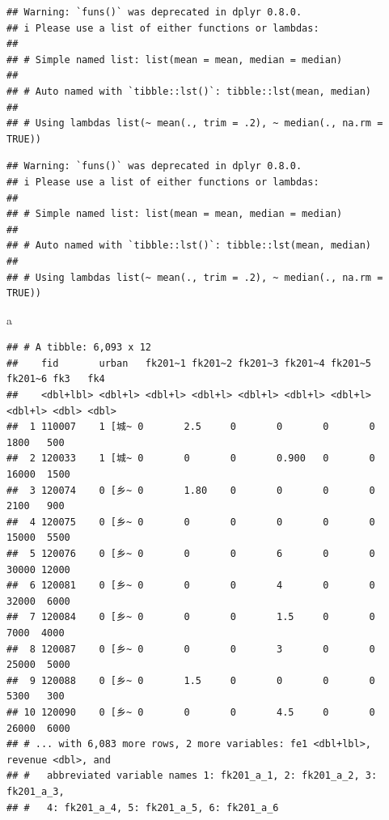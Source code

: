 \documentclass[
]{book}
\newenvironment{Shaded}{\begin{snugshade}}{\end{snugshade}}
\newcommand{\NormalTok}[1]{#1}
\begin{document}
\begin{verbatim}
## Warning: `funs()` was deprecated in dplyr 0.8.0.
## i Please use a list of either functions or lambdas:
## 
## # Simple named list: list(mean = mean, median = median)
## 
## # Auto named with `tibble::lst()`: tibble::lst(mean, median)
## 
## # Using lambdas list(~ mean(., trim = .2), ~ median(., na.rm = TRUE))
\end{verbatim}

\begin{verbatim}
## Warning: `funs()` was deprecated in dplyr 0.8.0.
## i Please use a list of either functions or lambdas:
## 
## # Simple named list: list(mean = mean, median = median)
## 
## # Auto named with `tibble::lst()`: tibble::lst(mean, median)
## 
## # Using lambdas list(~ mean(., trim = .2), ~ median(., na.rm = TRUE))
\end{verbatim}

\begin{Shaded}
\begin{Highlighting}[]
\NormalTok{a}
\end{Highlighting}
\end{Shaded}

\begin{verbatim}
## # A tibble: 6,093 x 12
##    fid       urban   fk201~1 fk201~2 fk201~3 fk201~4 fk201~5 fk201~6 fk3   fk4  
##    <dbl+lbl> <dbl+l> <dbl+l> <dbl+l> <dbl+l> <dbl+l> <dbl+l> <dbl+l> <dbl> <dbl>
##  1 110007    1 [城~ 0       2.5     0       0       0       0        1800   500
##  2 120033    1 [城~ 0       0       0       0.900   0       0       16000  1500
##  3 120074    0 [乡~ 0       1.80    0       0       0       0        2100   900
##  4 120075    0 [乡~ 0       0       0       0       0       0       15000  5500
##  5 120076    0 [乡~ 0       0       0       6       0       0       30000 12000
##  6 120081    0 [乡~ 0       0       0       4       0       0       32000  6000
##  7 120084    0 [乡~ 0       0       0       1.5     0       0        7000  4000
##  8 120087    0 [乡~ 0       0       0       3       0       0       25000  5000
##  9 120088    0 [乡~ 0       1.5     0       0       0       0        5300   300
## 10 120090    0 [乡~ 0       0       0       4.5     0       0       26000  6000
## # ... with 6,083 more rows, 2 more variables: fe1 <dbl+lbl>, revenue <dbl>, and
## #   abbreviated variable names 1: fk201_a_1, 2: fk201_a_2, 3: fk201_a_3,
## #   4: fk201_a_4, 5: fk201_a_5, 6: fk201_a_6
\end{verbatim}
\end{document}
